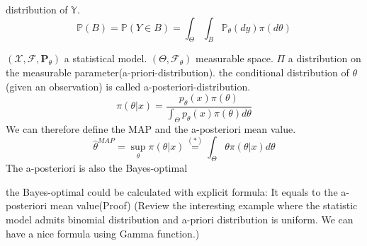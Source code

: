 \begin{definition}
distribution of $\mathbb{Y}$.
\begin{equation*}
	\mathbb{P}(B) = \mathbb{P}(Y \in B) = \int_\Theta \int_B \mathbb{P}_\theta(dy) \pi(d\theta)
\end{equation*}
\end{definition}




\begin{definition}
\((\mathcal{X}, \mathcal{F}, \mathbf{P}_{\theta})\) a statistical model. \((\Theta, \mathcal{F}_{\theta})\) measurable space.
 \(\Pi\) a distribution on the measurable parameter(a-priori-distribution).
    the conditional distribution of \(\theta \) (given an observation) is called a-posteriori-distribution. 
        \begin{equation*}
    	\pi(\theta|x) = \frac{p_\theta(x)\pi(\theta)	}{\int_\Theta p_\theta(x) \pi(\theta) d\theta}
    \end{equation*}
    We can therefore define the MAP and the a-posteriori mean value.
    \begin{equation*}
    	\hat{\theta}^{MAP} = \sup_\theta \pi(\theta|x) \overset{(*)}{=}\int_\Theta \theta \pi(\theta|x)d\theta
    \end{equation*}
The a-posteriori is also the Bayes-optimal

\end{definition}


\begin{remark}
the Bayes-optimal could be calculated with explicit formula: It equals to the a-posteriori mean value(Proof) (Review the interesting example where the statistic model admits binomial distribution and a-priori distribution is uniform. We can have a nice formula using Gamma function.)

\end{remark}

